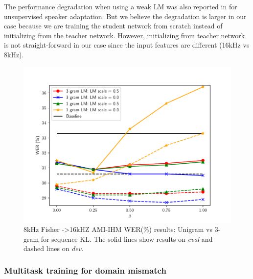 \documentclass{article}
\begin{document}
The performance degradation when using a 
weak LM was also reported in \cite{kanda2017sequence-kl} for unsupervised
speaker adaptation. But we believe the degradation is larger in our case because
we are training the student network from scratch instead of initializing from
the teacher network. However, initializing from teacher network is not 
straight-forward in our case since the input features are different (16kHz vs
8kHz).

\begin{figure}[t]
  \centering
  \caption{\label{fig:lm_comparison} 8kHz Fisher  -\textgreater 16kHZ AMI-IHM
  WER(\%) results: Unigram vs 3-gram for sequence-KL. The solid lines show
results on {\em eval} and dashed lines on {\em dev}.}
\includegraphics[width=\columnwidth]{figures/ug_comparison}
\end{figure}

\subsubsection{Multitask training for domain mismatch}
\end{document}

